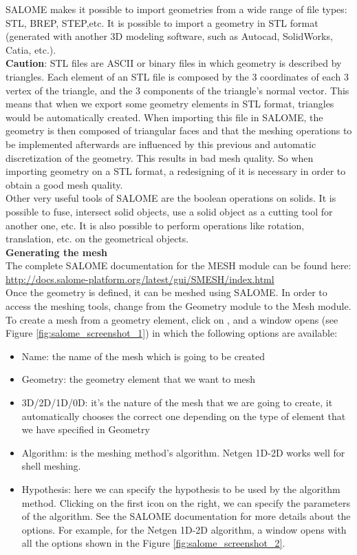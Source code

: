 \documentclass{../GPUSPHtemplate}
\begin{document}
SALOME makes it possible to import geometries from 
a wide range of file types: STL, BREP, STEP,etc. 
It is possible to import a geometry in STL format 
(generated with another 3D modeling software, such 
as Autocad, SolidWorks, Catia, etc.). \\

\textbf{Caution}: STL files are ASCII or binary 
files in which geometry is described by triangles. 
Each element of an STL file is composed by the 3 
coordinates of each 3 vertex of the triangle, 
and the 3 components of the triangle’s normal vector. 
This means that when we export some geometry 
elements in STL format, triangles would be automatically created. 
When importing this file in SALOME, the geometry is then 
composed of triangular faces and that the meshing operations 
to be implemented afterwards are influenced by this previous 
and automatic discretization of the geometry.
This results in bad mesh quality.
So when importing geometry on a STL format, a redesigning of it is necessary 
in order to obtain a good mesh quality.\\

Other very useful tools of SALOME are the boolean operations on solids.
It is possible to fuse, intersect solid objects, use a solid object as a 
cutting tool for another one, etc.
It is also possible to perform operations like rotation, translation, etc. on
the geometrical objects.\\

\textbf{Generating the mesh}\\

The complete SALOME documentation for the MESH module can be found here:\\
\url{http://docs.salome-platform.org/latest/gui/SMESH/index.html}\\

Once the geometry is defined, it can be meshed using SALOME.
In order to access the meshing tools, change from the Geometry 
module to the Mesh module.
To create a mesh from a geometry element, click on , 
and a window opens (see Figure \ref{fig:salome_screenshot_1}) in which the following options are available:
\begin{itemize}
\item Name: the name of the mesh which is going to be created
\item Geometry: the geometry element that we want to mesh
\item 3D/2D/1D/0D: it’s the nature of the mesh that we are 
going to create, it automatically chooses the correct one 
depending on the type of element that we have specified in Geometry
\item Algorithm: is the meshing method’s algorithm. 
Netgen 1D-2D works well for shell meshing.
\item Hypothesis: here we can specify the hypothesis to be used 
by the algorithm method. Clicking on the first icon on the right, 
we can specify the parameters of the algorithm. See the SALOME 
documentation for more details about the options. 
For example, for the Netgen 1D-2D algorithm, a window opens 
with all the options shown in the Figure \ref{fig:salome_screenshot_2}.
\end{itemize}
\end{document}
